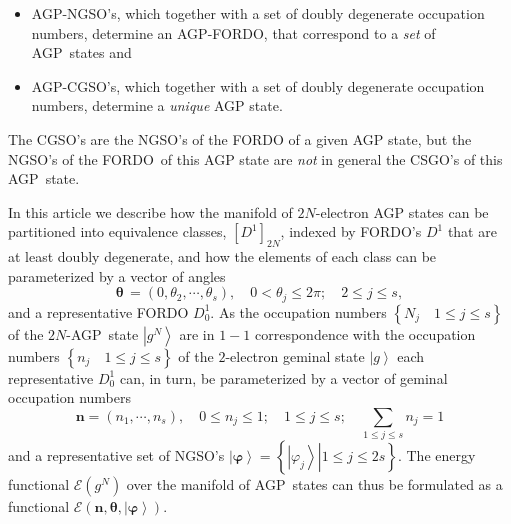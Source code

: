 \documentclass[aps,preprint]{revtex4}%
\begin{document}
\begin{itemize}
\item AGP-NGSO's, which together with a set of doubly degenerate occupation
numbers, determine an AGP-FORDO, that correspond to a \emph{set }of
AGP\ states and

\item AGP-CGSO's, which together with a set of doubly degenerate occupation
numbers, determine a \emph{unique} AGP state.
\end{itemize}

The CGSO's are the NGSO's of the FORDO of a given AGP state, but the NGSO's of
the FORDO\ of this AGP state are \emph{not }in general the CSGO's of this AGP\ state.

In this article we describe how the manifold of $2N$-electron AGP states can
be partitioned into equivalence classes, $\left[  D^{1}\right]  _{2N}$,
indexed by FORDO's $D^{1}$ that are at least doubly degenerate, and how the
elements of each class can be parameterized by a vector of angles
\begin{equation}
\mathbf{\theta\,}=\left(  0,\theta_{2},\cdots,\theta_{s}\right)
,\quad0<\theta_{j}\leq2\pi;\quad2\leq j\leq s,
\end{equation}
and a representative FORDO $D_{0}^{1}.$ As the occupation numbers $\left\{
N_{j}\quad1\leq j\leq s\right\}  $ of the $2N$-AGP\ state $\left\vert
g^{N}\right\rangle $ are in $1-1$ correspondence \cite{Colemann} with the
occupation numbers $\left\{  n_{j}\quad1\leq j\leq s\right\}  $ of the
$2$-electron geminal state $\left\vert g\right\rangle $ each representative
$D_{0}^{1}$ can, in turn, be parameterized by a vector of geminal occupation
numbers%
\begin{equation}
\mathbf{n}=\left(  n_{1},\cdots,n_{s}\right)  ,\quad0\leq n_{j}\leq
1;\quad1\leq j\leq s;\quad%
{\textstyle\sum\limits_{1\leq j\leq s}}
n_{j}=1
\end{equation}
and a representative set of NGSO's $\left\vert \mathbf{\varphi}\right\rangle
=\left\{  \left.  \left\vert \varphi_{j}\right\rangle \right\vert 1\leq
j\leq2s\right\}  $. The energy functional $\mathcal{E}\left(  g^{N}\right)  $
over the manifold of AGP\ states can thus be formulated as a functional
$\mathcal{E}\left(  \mathbf{n},\mathbf{\theta,}\left\vert \mathbf{\varphi
}\right\rangle \right)  $.
\end{document}
